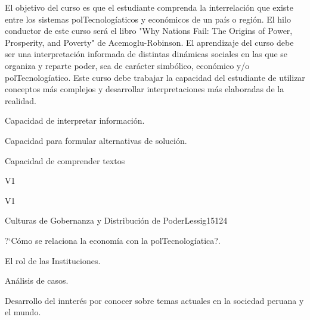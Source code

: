 \begin{syllabus}


\begin{justification}
El objetivo del curso es que el estudiante comprenda la interrelación que existe entre los sistemas polTecnologíaticos y económicos de un país o región. El hilo conductor de este curso será el libro "Why Nations Fail: The Origins of Power, Prosperity, and Poverty" de Acemoglu-Robinson. El aprendizaje del curso debe ser una interpretación informada de distintas dinámicas sociales en las que se organiza y reparte poder, sea de carácter simbólico, económico y/o polTecnologíatico.  
Este curso debe trabajar la capacidad del estudiante de utilizar conceptos más complejos y desarrollar interpretaciones más elaboradas de la realidad.
\end{justification}

\begin{goals}
\item Capacidad de interpretar información.
\item Capacidad para formular alternativas de solución.
\item Capacidad de comprender textos
\end{goals}

\begin{outcomes}{V1}
    \item {}
    \item {}
    \item {}
    
\end{outcomes}

\begin{competences}{V1}
    \item {}
    \item {}
    \item {}
    \item {}
\end{competences}

\begin{unit}{Culturas de Gobernanza y Distribución de Poder}{}{Lessig15}{12}{4}
   \begin{topics}
      \item ?`Cómo se relaciona la economía con la polTecnologíatica?.
      \item El rol de las Instituciones.
      \item Análisis de casos.
   \end{topics}
   \begin{learningoutcomes}
      \item Desarrollo del innterés por conocer sobre temas actuales en la sociedad peruana y el mundo.
   \end{learningoutcomes}
\end{unit}

\begin{coursebibliography}
\end{coursebibliography}

\end{syllabus}
